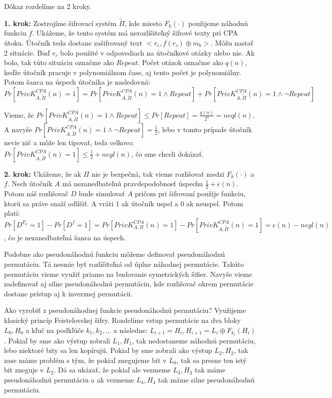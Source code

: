 \begin{dokaz}
Dôkaz rozdelíme na 2 kroky.

{\bf 1. krok:} Zostrojíme šifrovací systém $\tilde{\Pi}$, kde miesto $F_k(\cdot)$ použijeme
náhodnú funkciu $f$. Ukážeme, že tento systém má nerozlíšiteľný šifrové texty pri CPA útoku.
Útočník teda dostane zašifrovaný text $<r_c, f(r_c) \oplus m_b>$.
Môžu nastať 2 situácie. Buď $r_c$ bolo použité v odpovediach na útočníkové otázky alebo nie. Ak bolo, tak túto situáciu
označme ako $Repeat$. Počet otázok označme ako $q(n)$, keďže útočník pracuje v polynomiálnom čase, aj
tento počet je polynomiálny. Potom šanca na úspech útočníka je nasledovná:
$$Pr[PrivK_{A,\tilde{\Pi}}^{CPA}(n)=1] = Pr[PrivK_{A,\tilde{\Pi}}^{CPA}(n)=1\land Repeat]  + Pr[PrivK_{A,\tilde{\Pi}}^{CPA}(n)=1 \land \neg Repeat]$$

Vieme, že $Pr[PrivK_{A,\tilde{\Pi}}^{CPA}(n)=1\land Repeat] \leq Pr[Repeat] = \frac{q(n)}{2^n} = neql(n)$.
A navyše $Pr[PrivK_{A,\tilde{\Pi}}^{CPA}(n)=1\land \neg Repeat] = \frac{1}{2}$, lebo v tomto prípade útočník
nevie nič a môže len tipovať, teda celkovo: $Pr[PrivK_{A,\tilde{\Pi}}^{CPA}(n)=1] \leq \frac{1}{2} + negl(n)$, čo sme chceli dokázať.

{\bf 2. krok:} Ukážeme, že ak $\Pi$ nie je bezpečná, tak vieme rozlišovať medzi $F_k(\cdot)$ a $f$.
Nech útočník $A$ má nezanedbateľnú pravdepodobnosť úspechu $\frac{1}{2}+\epsilon(n)$. 
Potom náš rozlišovač $D$ bude simulovať $A$ pričom pri šifrovaní použije funkciu, ktorú sa práve 
snaží odlíšiť. A vráti $1$ ak útočník uspel a $0$ ak neuspel.
Potom platí: $Pr[D^{F_k} = 1] - Pr[D^f = 1] = Pr[PrivK_{A,\Pi}^{CPA}(n)=1] - Pr[PrivK_{A,\tilde{\Pi}}^{CPA}(n)=1] 
= \epsilon(n) - negl(n)$, čo je nezanedbateľná šanca na úspech.
\end{dokaz}

Podobne ako pseudonáhodnú funkciu môžeme definovať pseudonáhodnú permutáciu. Tá nesmie byť rozlíšiteľná od úplne
náhodnej permutácie. Takúto permutáciu vieme využiť priamo na budovanie symetrických šifier.
Navyše vieme zadefinovať aj silne pseudonáhodnú permutáciu, kde rozlišovač okrem permutácie dostane prístup aj
k inverznej permutácii.

\begin{priklad}
Ako vyrobiť z pseudonáhodnej funkcie pseudonáhodnú permutáciu? Využijeme klasický princíp
Feistelovskej šifry. Rozdelíme vstup permutácie na dva bloky $L_0, H_0$ a kľuč na podkľúče $k_1, k_2, \dots$ a následne:
$L_{i+1} = H_{i}, H_{i+1} = L_{i} \oplus F_{k_i}(H_i)$.
Pokiaľ by sme ako výstup zobrali $L_1, H_1$, tak nedostaneme náhodnú permutáciu, lebo niektoré bity sa len kopírujú.
Pokiaľ by sme zobrali ako výstup $L_2, H_2$, tak zase máme problém s tým, že pokiaľ znegujeme bit v $L_0$, tak sa presne ten
istý bit zneguje v $L_2$. Dá sa ukázať, že pokiaľ ale vezmeme $L_3, H_3$ tak máme pseudonáhodnú permutáciu a ak vezmeme $L_4, H_4$
tak máme silne pseudonáhodnú permutáciu.
\end{priklad}

